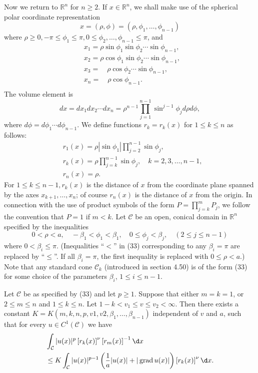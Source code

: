 \begin{para}
  Now we return to $\mathbb{R}^n$ for $n \geq 2$. If $x \in \mathbb{R}^n$, we shall make use of the spherical polar coordinate representation
  \[
  x=(\rho, \phi)=\left(\rho, \phi_1, \ldots, \phi_{n-1}\right)
  \]
  where $\rho \geq 0,-\pi \leq \phi_1 \leq \pi, 0 \leq \phi_2, \ldots, \phi_{n-1} \leq \pi$, and
  \[
  \begin{aligned}
  & x_1=\rho \sin \phi_1 \sin \phi_2 \cdots \sin \phi_{n-1}, \\
  & x_2=\rho \cos \phi_1 \sin \phi_2 \cdots \sin \phi_{n-1} \text {, } \\
  & x_3=\quad \rho \cos \phi_2 \cdots \sin \phi_{n-1} \text {, } \\
  & x_n=\quad \rho \cos \phi_{n-1} \text {. } \\
  &
  \end{aligned}
  \]
  The volume element is
  \[
  d x=d x_1 d x_2 \cdots d x_n=\rho^{n-1} \prod_{j=1}^{n-1} \sin ^{j-1} \phi_j d \rho d \phi,
  \]
  where $d \phi=d \phi_1 \cdots d \phi_{n-1}$.
  We define functions $r_k=r_k(x)$ for $1 \leq k \leq n$ as follows:
  \[
  \begin{aligned}
  & r_1(x)=\rho\left|\sin \phi_1\right| \prod_{j=2}^{n-1} \sin \phi_j, \\
  & r_k(x)=\rho \prod_{j=k}^{n-1} \sin \phi_j, \quad k=2,3, \ldots, n-1, \\
  & r_n(x)=\rho .
  \end{aligned}
  \]
  For $1 \leq k \leq n-1, r_k(x)$ is the distance of $x$ from the coordinate plane spanned by the axes $x_{k+1}, \ldots, x_n$; of course $r_n(x)$ is the distance of $x$ from the origin. In connection with the use of product symbols of the form $P=\prod_{j=k}^m P_j$, we follow the convention that $P=1$ if $m<k$.
  Let $\mathcal{C}$ be an open, conical domain in $\mathbb{R}^n$ specified by the inequalities
  \[
  0<\rho<a, \quad-\beta_1<\phi_1<\beta_1, \quad 0 \leq \phi_j<\beta_j, \quad(2 \leq j \leq n-1)
  \]
  where $0<\beta_i \leq \pi$. (Inequalities ``$<$'' in (33) corresponding to any $\beta_i=\pi$
  are replaced by ``$\leq$''. If all $\beta_i=\pi$, the first inequality is replaced with $0 \leq \rho<a$.)
  Note that any standard cone $\mathcal{C}_k$ (introduced in section 4.50) is of the form (33)
  for some choice of the parameters $\beta_i$, $1 \leq i \leq n-1$.
\end{para}


\begin{lemma}
  Let $\mathcal{C}$ be as specified by (33) and let $p \geq 1$. Suppose that either $m=k=1$, or $2 \leq m \leq n$ and $1 \leq k \leq n$. Let $1-k<v_1 \leq v \leq v_2<\infty$. Then there exists a constant $K=K\left(m, k, n, p, v 1, v 2, \beta_1, \ldots, \beta_{n-1}\right)$ independent of $v$ and $a$, such that for every $u \in C^1(\mathcal{C})$ we have
  \[
  \begin{aligned}
  & \int_{\mathcal{C}}|u(x)|^p\left[r_k(x)\right]^\nu\left[r_m(x)\right]^{-1} \d x \\
  & \leq K \int_{\mathcal{C}}|u(x)|^{p-1}\left(\frac{1}{a}|u(x)|+|\grad u(x)|\right)\left[r_k(x)\right]^\nu \d x .
  \end{aligned}
  \]
\end{lemma}

